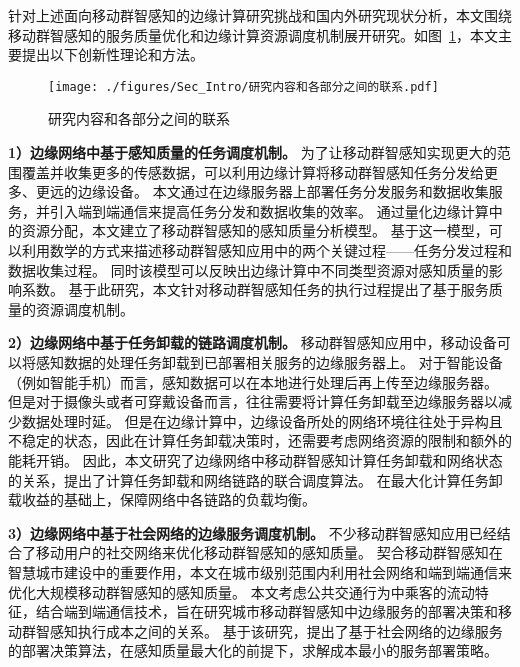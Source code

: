 针对上述面向移动群智感知的边缘计算研究挑战和国内外研究现状分析，本文围绕移动群智感知的服务质量优化和边缘计算资源调度机制展开研究。如图~\ref{Figure_Re_Part}，本文主要提出以下创新性理论和方法。

\begin{figure}[!h]
  \centering
  \texttt{[image: ./figures/Sec\_Intro/研究内容和各部分之间的联系.pdf]}
  \vspace{-0.5em}
  \caption{研究内容和各部分之间的联系}
  \label{Figure_Re_Part}
\end{figure}

\textbf{1）边缘网络中基于感知质量的任务调度机制。}
为了让移动群智感知实现更大的范围覆盖并收集更多的传感数据，可以利用边缘计算将移动群智感知任务分发给更多、更远的边缘设备。
本文通过在边缘服务器上部署任务分发服务和数据收集服务，并引入端到端通信来提高任务分发和数据收集的效率。
通过量化边缘计算中的资源分配，本文建立了移动群智感知的感知质量分析模型。
基于这一模型，可以利用数学的方式来描述移动群智感知应用中的两个关键过程——任务分发过程和数据收集过程。
同时该模型可以反映出边缘计算中不同类型资源对感知质量的影响系数。
基于此研究，本文针对移动群智感知任务的执行过程提出了基于服务质量的资源调度机制。

\textbf{2）边缘网络中基于任务卸载的链路调度机制。}
移动群智感知应用中，移动设备可以将感知数据的处理任务卸载到已部署相关服务的边缘服务器上。
对于智能设备（例如智能手机）而言，感知数据可以在本地进行处理后再上传至边缘服务器。
但是对于摄像头或者可穿戴设备而言，往往需要将计算任务卸载至边缘服务器以减少数据处理时延。
但是在边缘计算中，边缘设备所处的网络环境往往处于异构且不稳定的状态，因此在计算任务卸载决策时，还需要考虑网络资源的限制和额外的能耗开销。
因此，本文研究了边缘网络中移动群智感知计算任务卸载和网络状态的关系，提出了计算任务卸载和网络链路的联合调度算法。
在最大化计算任务卸载收益的基础上，保障网络中各链路的负载均衡。

\textbf{3）边缘网络中基于社会网络的边缘服务调度机制。}
不少移动群智感知应用已经结合了移动用户的社交网络来优化移动群智感知的感知质量。
契合移动群智感知在智慧城市建设中的重要作用，本文在城市级别范围内利用社会网络和端到端通信来优化大规模移动群智感知的感知质量。
本文考虑公共交通行为中乘客的流动特征，结合端到端通信技术，旨在研究城市移动群智感知中边缘服务的部署决策和移动群智感知执行成本之间的关系。
基于该研究，提出了基于社会网络的边缘服务的部署决策算法，在感知质量最大化的前提下，求解成本最小的服务部署策略。

